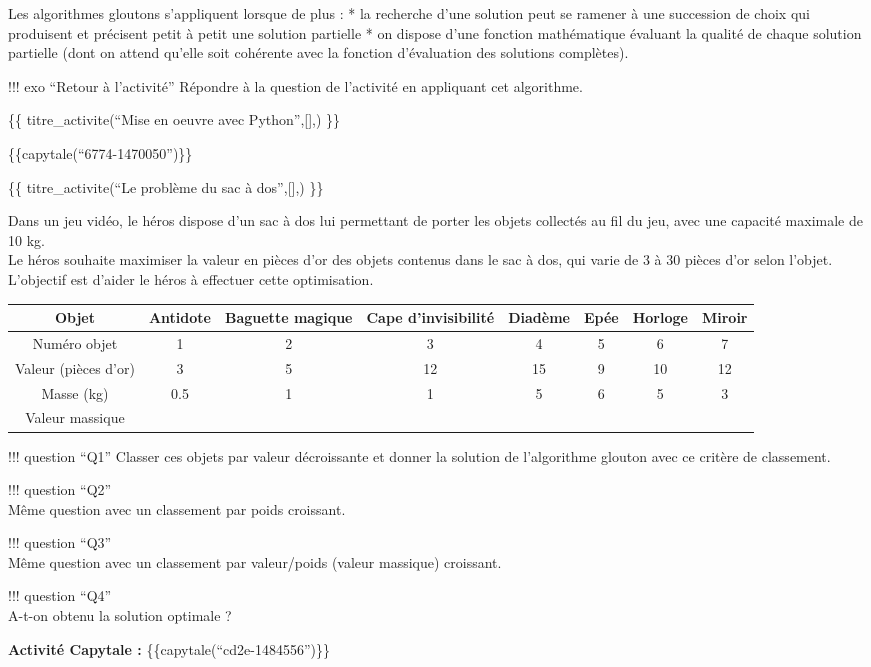Les algorithmes gloutons s'appliquent lorsque de plus : * la recherche
d'une solution peut se ramener à une succession de choix qui produisent
et précisent petit à petit une solution partielle * on dispose d'une
fonction mathématique évaluant la qualité de chaque solution partielle
(dont on attend qu'elle soit cohérente avec la fonction d'évaluation des
solutions complètes).

!!! exo ``Retour à l'activité'' Répondre à la question de l'activité en
appliquant cet algorithme.

\{\{ titre\_activite(``Mise en oeuvre avec Python'',{[}{]},) \}\}

\{\{capytale(``6774-1470050'')\}\}

\{\{ titre\_activite(``Le problème du sac à dos'',{[}{]},) \}\}

Dans un jeu vidéo, le héros dispose d'un sac à dos lui permettant de
porter les objets collectés au fil du jeu, avec une capacité maximale de
10 kg.\\
Le héros souhaite maximiser la valeur en pièces d'or des objets contenus
dans le sac à dos, qui varie de 3 à 30 pièces d'or selon l'objet.\\
L'objectif est d'aider le héros à effectuer cette optimisation.

\begin{longtable}[]{@{}cccccccc@{}}
\toprule
Objet & Antidote & Baguette magique & Cape d'invisibilité & Diadème &
Epée & Horloge & Miroir\tabularnewline
\midrule
\endhead
Numéro objet & 1 & 2 & 3 & 4 & 5 & 6 & 7\tabularnewline
Valeur (pièces d'or) & 3 & 5 & 12 & 15 & 9 & 10 & 12\tabularnewline
Masse (kg) & 0.5 & 1 & 1 & 5 & 6 & 5 & 3\tabularnewline
Valeur massique & & & & & & &\tabularnewline
\bottomrule
\end{longtable}

!!! question ``Q1'' Classer ces objets par valeur décroissante et donner
la solution de l'algorithme glouton avec ce critère de classement.

!!! question ``Q2''\\
Même question avec un classement par poids croissant.

!!! question ``Q3''\\
Même question avec un classement par valeur/poids (valeur massique)
croissant.

!!! question ``Q4''\\
A-t-on obtenu la solution optimale ?

\textbf{Activité Capytale :} \{\{capytale(``cd2e-1484556'')\}\}

